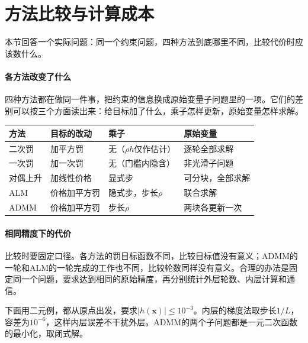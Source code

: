 \section{方法比较与计算成本}
\label{sec:pm-comparison}

本节回答一个实际问题：同一个约束问题，四种方法到底哪里不同，比较代价时应该数什么。

\paragraph{各方法改变了什么}
四种方法都在做同一件事，把约束的信息换成原始变量子问题里的一项。它们的差别可以按三个方面读出来：给目标加了什么，乘子怎样更新，原始变量怎样求解。

\begin{BookInlineTable}
  \centering
  \small
  \begin{tabular}{@{}llll@{}}
    \toprule
    方法 & 目标的改动 & 乘子 & 原始变量\\
    \midrule
    二次罚 & 加平方罚 & 无（$\rho h$仅作估计） & 逐轮全部求解\\
    一次罚 & 加一次罚 & 无（门槛内隐含） & 非光滑子问题\\
    对偶上升 & 加线性价格 & 显式步 & 可分块，全部求解\\
    ALM & 价格加平方罚 & 隐式步，步长$\rho$ & 联合求解\\
    ADMM & 价格加平方罚 & 步长$\rho$ & 两块各更新一次\\
    \bottomrule
  \end{tabular}
  \caption{各方法的结构对照。}
  \label{tab:pm-structure}
\end{BookInlineTable}

\paragraph{相同精度下的代价}
比较时要固定口径。各方法的罚目标函数不同，比较目标值没有意义；ADMM的一轮和ALM的一轮完成的工作也不同，比较轮数同样没有意义。合理的办法是固定同一个问题，要求达到相同的原始精度，再分别统计外层轮数、内层计算和通信。

下面用二元例，都从原点出发，要求$\lvert h(\bm{x})\rvert\leq10^{-3}$。内层的梯度法取步长$1/L$，容差为$10^{-6}$，这样内层误差不干扰外层。ADMM的两个子问题都是一元二次函数的最小化，取闭式解。

